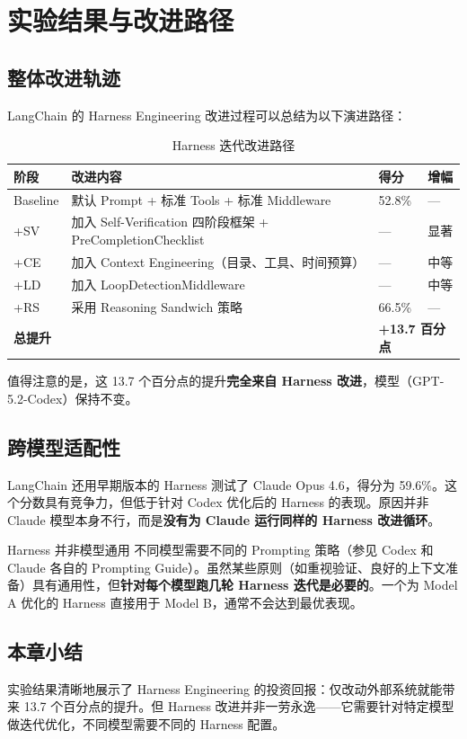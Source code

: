 \section{实验结果与改进路径}

\subsection{整体改进轨迹}

LangChain 的 Harness Engineering 改进过程可以总结为以下演进路径：

\begin{table}[H]
\centering
\caption{Harness 迭代改进路径}
\begin{tabular}{p{1.5cm}p{6cm}p{2cm}p{2.5cm}}
\toprule
\textbf{阶段} & \textbf{改进内容} & \textbf{得分} & \textbf{增幅} \\
\midrule
Baseline & 默认 Prompt + 标准 Tools + 标准 Middleware & 52.8\% & --- \\
+SV & 加入 Self-Verification 四阶段框架 + PreCompletionChecklist & --- & 显著 \\
+CE & 加入 Context Engineering（目录、工具、时间预算） & --- & 中等 \\
+LD & 加入 LoopDetectionMiddleware & --- & 中等 \\
+RS & 采用 Reasoning Sandwich 策略 & 66.5\% & --- \\
\midrule
\multicolumn{2}{l}{\textbf{总提升}} & \multicolumn{2}{l}{\textbf{+13.7 百分点}} \\
\bottomrule
\end{tabular}
\end{table}

值得注意的是，这 13.7 个百分点的提升\textbf{完全来自 Harness 改进}，模型（GPT-5.2-Codex）保持不变。

\subsection{跨模型适配性}

LangChain 还用早期版本的 Harness 测试了 Claude Opus 4.6，得分为 59.6\%。这个分数具有竞争力，但低于针对 Codex 优化后的 Harness 的表现。原因并非 Claude 模型本身不行，而是\textbf{没有为 Claude 运行同样的 Harness 改进循环}。

\begin{warningbox}{Harness 并非模型通用}
不同模型需要不同的 Prompting 策略（参见 Codex 和 Claude 各自的 Prompting Guide）。虽然某些原则（如重视验证、良好的上下文准备）具有通用性，但\textbf{针对每个模型跑几轮 Harness 迭代是必要的}。一个为 Model A 优化的 Harness 直接用于 Model B，通常不会达到最优表现。
\end{warningbox}

\subsection{本章小结}

实验结果清晰地展示了 Harness Engineering 的投资回报：仅改动外部系统就能带来 13.7 个百分点的提升。但 Harness 改进并非一劳永逸——它需要针对特定模型做迭代优化，不同模型需要不同的 Harness 配置。


